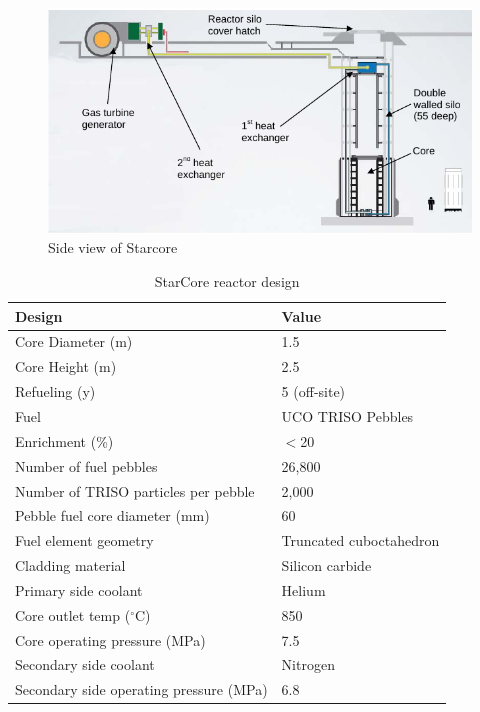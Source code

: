 \begin{figure}[htbp]
\centering
\includegraphics[scale=0.7]{Figs/starcoreview.jpeg}
\caption{Side view of Starcore}
\label{Starview}
\end{figure}

\begin{table} [ht]
\begin{center}

\caption{StarCore reactor design}
\label{startable}
\begin{tabular}{l l}
\hline 
Design 		&Value \\ 
\hline 
Core Diameter (m) 		&1.5 \\ 
Core Height (m) 		&2.5 \\ 
Refueling (y)		&  5 (off-site)\\ 
Fuel		&UCO TRISO Pebbles \\ 
Enrichment (\%)		&$<$20 \\ 
Number of fuel pebbles		&26,800 \\ 
Number of TRISO particles per pebble		&2,000 \\ 
Pebble fuel core diameter (mm)		&60 \\ 
Fuel element geometry & Truncated cuboctahedron\\ 
Cladding material & Silicon carbide \\ 
Primary side coolant 	&Helium \\ 
Core outlet temp ($^\circ{}$C) 	&850 \\ 
Core operating pressure (MPa)	&7.5 \\ 
Secondary side coolant	&Nitrogen \\ 
Secondary side operating pressure (MPa)	&6.8 \\ 
\hline 

\end{tabular}
\end{center}
\end{table}

